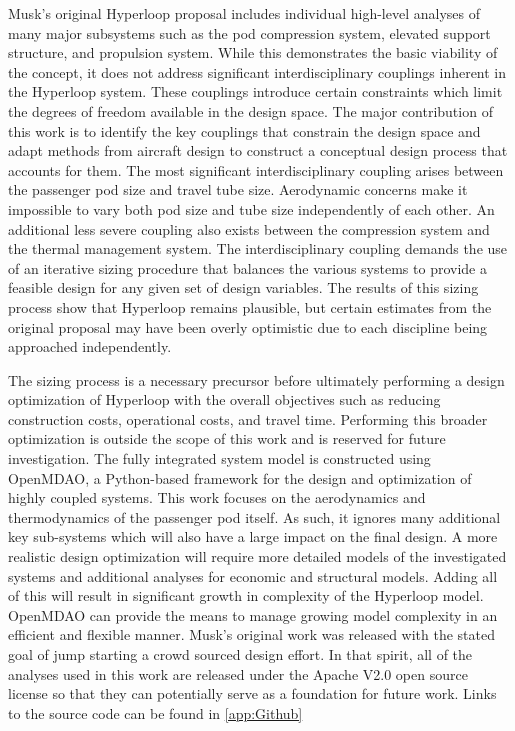 \documentclass[heading.tex]{subfiles}
\begin{document}
Musk's original Hyperloop proposal includes individual high-level analyses of many major subsystems such as the pod compression system,
elevated support structure, and propulsion system. While this demonstrates the basic viability of the concept, it does not address
significant interdisciplinary couplings inherent in the Hyperloop system. These couplings introduce certain constraints which limit the 
degrees of freedom available in the design space. The major contribution of this work is to identify the key couplings that constrain the design space
and adapt methods from aircraft design to construct a conceptual design process that accounts for them. The most significant 
interdisciplinary coupling arises between the passenger pod size and travel tube size. Aerodynamic concerns make it impossible to vary 
both pod size and tube size independently of each other. An additional less severe coupling also exists between the compression system and 
the thermal management system. The interdisciplinary coupling demands the use of an iterative sizing procedure that balances 
the various systems to provide a feasible design for any given set of design variables. The results of this sizing process show that
Hyperloop remains plausible, but certain estimates from the original proposal may have been overly optimistic due to each discipline being approached independently. 

The sizing process is a necessary precursor before ultimately performing a design optimization of 
Hyperloop with the overall objectives such as reducing construction costs, operational costs, and travel time.
Performing this broader optimization 
is outside the scope of this work and is reserved for future investigation. 
The fully integrated system model is constructed using OpenMDAO, a Python-based framework for 
the design and optimization of highly coupled systems\cite{GrayBenchmarking2013}. 
This work focuses on the aerodynamics and thermodynamics of the passenger pod itself.
As such, it ignores many additional key sub-systems which will also have a large impact on the final design.
A more realistic design optimization will require more detailed models of the investigated systems and additional analyses for economic and 
structural models. Adding all of this will result in significant growth in complexity of the Hyperloop model. 
OpenMDAO can provide the means to manage growing model complexity 
in an efficient and flexible manner. Musk's original work was released with the stated goal of jump starting
a crowd sourced design effort. In that spirit, all of the analyses used in this work are released under
the Apache V2.0 open source license so that they can potentially serve as a foundation for future work. 
Links to the source code can be found in \cref{app:Github}
\end{document}
